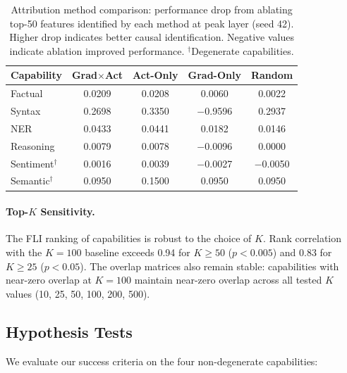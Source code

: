 \documentclass{article}
\begin{document}
\begin{table}[t]
\centering
\caption{Attribution method comparison: performance drop from ablating top-50 features identified by each method at peak layer (seed 42). Higher drop indicates better causal identification. Negative values indicate ablation improved performance. $^\dagger$Degenerate capabilities.}
\label{tab:ablation}
\begin{tabular}{lcccc}
\toprule
Capability & Grad$\times$Act & Act-Only & Grad-Only & Random \\
\midrule
Factual   & 0.0209 & 0.0208 & 0.0060  & 0.0022 \\
Syntax    & 0.2698 & 0.3350 & $-$0.9596 & 0.2937 \\
NER       & 0.0433 & 0.0441 & 0.0182  & 0.0146 \\
Reasoning & 0.0079 & 0.0078 & $-$0.0096 & 0.0000 \\
\midrule
Sentiment$^\dagger$ & 0.0016 & 0.0039 & $-$0.0027 & $-$0.0050 \\
Semantic$^\dagger$  & 0.0950 & 0.1500 & 0.0950  & 0.0950 \\
\bottomrule
\end{tabular}
\end{table}

\paragraph{Top-$K$ Sensitivity.}
The FLI ranking of capabilities is robust to the choice of $K$. Rank correlation with the $K=100$ baseline exceeds 0.94 for $K \geq 50$ ($p < 0.005$) and 0.83 for $K \geq 25$ ($p < 0.05$). The overlap matrices also remain stable: capabilities with near-zero overlap at $K=100$ maintain near-zero overlap across all tested $K$ values (10, 25, 50, 100, 200, 500).

\subsection{Hypothesis Tests}
\label{sec:hypothesis_tests}

We evaluate our success criteria on the four non-degenerate capabilities:
\end{document}
